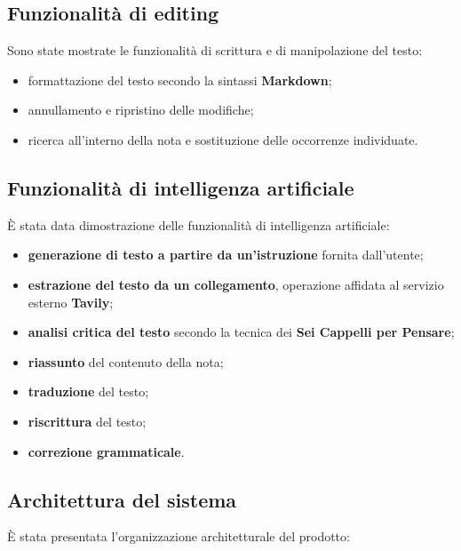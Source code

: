 \documentclass[a4paper, 10pt, colorlinks=true, linkcolor=black, urlcolor=blue, citecolor=blue, hidelinks]{article}
\begin{document}
\subsection{Funzionalità di editing}

Sono state mostrate le funzionalità di scrittura e di manipolazione del testo:

\begin{itemize}
    \item formattazione del testo secondo la sintassi \textbf{Markdown};
    \item annullamento e ripristino delle modifiche;
    \item ricerca all'interno della nota e sostituzione delle occorrenze individuate.
\end{itemize}

\subsection{Funzionalità di intelligenza artificiale}

È stata data dimostrazione delle funzionalità di intelligenza artificiale:

\begin{itemize}
    \item \textbf{generazione di testo a partire da un'istruzione} fornita dall'utente;
    \item \textbf{estrazione del testo da un collegamento}, operazione affidata al servizio esterno \textbf{Tavily};
    \item \textbf{analisi critica del testo} secondo la tecnica dei \textbf{Sei Cappelli per Pensare};
    \item \textbf{riassunto} del contenuto della nota;
    \item \textbf{traduzione} del testo;
    \item \textbf{riscrittura} del testo;
    \item \textbf{correzione grammaticale}.
\end{itemize}

\subsection{Architettura del sistema}

È stata presentata l'organizzazione architetturale del prodotto:
\end{document}
